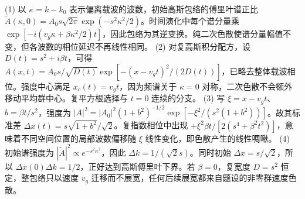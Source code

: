 (1) 以 \(\kappa=k-k_0\) 表示偏离载波的波数，初始高斯包络的傅里叶谱正比 \(\widetilde A(\kappa,0)=A_0s\sqrt{2\pi}\exp(-s^2\kappa^2/2)\)。时间演化中每个谱分量乘 \(\exp[-i(v_g\kappa+\beta\kappa^2/2)t]\)，因此包络为其逆变换。纯二次色散使谱分量幅值不变，但各波数的相位延迟不再线性相同。
(2) 对复高斯积分配方，设 \(D(t)=s^2+i\beta t\)，可得 \(A(x,t)=A_0s/\sqrt{D(t)}\exp[-(x-v_gt)^2/(2D(t))]\)，已略去整体载波相位。强度中心满足 \(x_c(t)=v_gt\)，因为频谱关于 \(\kappa=0\) 对称，二次色散不会额外移动平均群中心。复平方根选择与 \(t=0\) 连续的分支。
(3) 写 \(\xi=x-v_gt\)、\(b=\beta t/s^2\)，强度为 \(|A|^2=|A_0|^2(1+b^2)^{-1/2}\exp[-\xi^2/(s^2(1+b^2))]\)。故其标准差 \(\Delta x(t)=s\sqrt{1+b^2}/\sqrt2\)。复指数相位中出现 \(+\xi^2\beta t/[2(s^4+\beta^2t^2)]\)，意味着不同空间位置的局部波数偏移随 \(\xi\) 线性变化，即色散产生的线性啁啾。
(4) 初始谱强度为 \(|\widetilde A|^2\propto e^{-s^2\kappa^2}\)，因此 \(\Delta k=1/(\sqrt2s)\)。同时初始 \(\Delta x=s/\sqrt2\)，所以 \(\Delta x(0)\Delta k=1/2\)，正好达到高斯傅里叶下界。若 \(\beta=0\)，复宽度 \(D=s^2\) 恒定，整包络只以速度 \(v_g\) 迁移而不展宽，任何后续展宽都来自题设的非零群速度色散。
